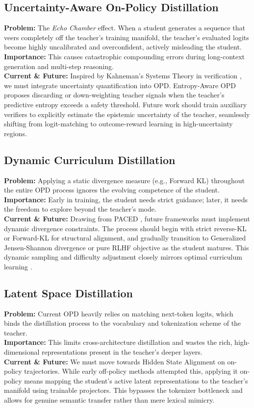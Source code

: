 \documentclass{article}
\begin{document}
\subsection{Uncertainty-Aware On-Policy Distillation}
\textbf{Problem:} The \textit{Echo Chamber} effect. When a student generates a sequence that veers completely off the teacher's training manifold, the teacher's evaluated logits become highly uncalibrated and overconfident, actively misleading the student. \\
\textbf{Importance:} This causes catastrophic compounding errors during long-context generation and multi-step reasoning. \\
\textbf{Current \& Future:} Inspired by Kahneman's Systems Theory in verification \citep{arxiv_2502_11157}, we must integrate uncertainty quantification into OPD. Entropy-Aware OPD \citep{arxiv_2603_07079} proposes discarding or down-weighting teacher signals when the teacher's predictive entropy exceeds a safety threshold. Future work should train auxiliary verifiers to explicitly estimate the epistemic uncertainty of the teacher, seamlessly shifting from logit-matching to outcome-reward learning in high-uncertainty regions.

\subsection{Dynamic Curriculum Distillation}
\textbf{Problem:} Applying a static divergence measure (e.g., Forward KL) throughout the entire OPD process ignores the evolving competence of the student. \\
\textbf{Importance:} Early in training, the student needs strict guidance; later, it needs the freedom to explore beyond the teacher's mode. \\
\textbf{Current \& Future:} Drawing from PACED \citep{arxiv_2603_11178}, future frameworks must implement dynamic divergence constraints. The process should begin with strict reverse-KL or Forward-KL for structural alignment, and gradually transition to Generalized Jensen-Shannon divergence or pure RLHF objective as the student matures. This dynamic sampling and difficulty adjustment closely mirrors optimal curriculum learning \citep{arxiv_2403_02241}.

\subsection{Latent Space Distillation}
\textbf{Problem:} Current OPD heavily relies on matching next-token logits, which binds the distillation process to the vocabulary and tokenization scheme of the teacher. \\
\textbf{Importance:} This limits cross-architecture distillation and wastes the rich, high-dimensional representations present in the teacher's deeper layers. \\
\textbf{Current \& Future:} We must move towards Hidden State Alignment on on-policy trajectories. While early off-policy methods attempted this, applying it on-policy means mapping the student's active latent representations to the teacher's manifold using trainable projectors. This bypasses the tokenizer bottleneck and allows for genuine semantic transfer rather than mere lexical mimicry.
\end{document}
